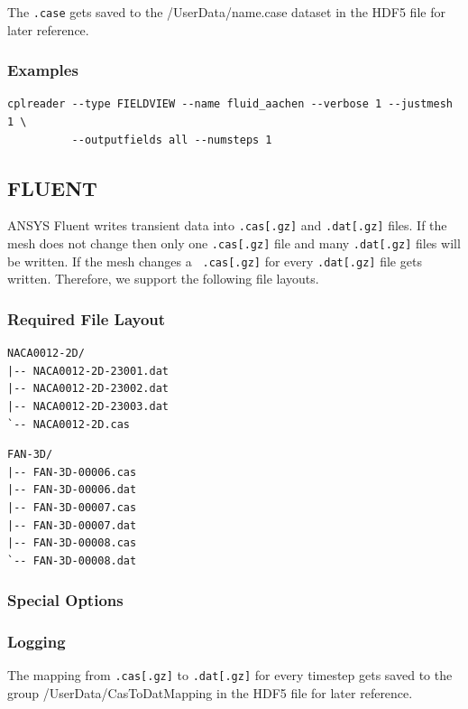 \documentclass[a4paper,10pt]{article}
\begin{document}
The {\tt .case} gets saved to the /UserData/name.case dataset in the HDF5 file
for later reference.

\subsubsection{Examples}

\begin{verbatim}
cplreader --type FIELDVIEW --name fluid_aachen --verbose 1 --justmesh 1 \
          --outputfields all --numsteps 1
\end{verbatim}

\newpage
\subsection{FLUENT}
\label{sec:fluent}

ANSYS Fluent  writes transient data  into {\tt .cas[.gz]} and  {\tt .dat[.gz]}
files.  If  the mesh does  not change then  only one {\tt .cas[.gz]}  file and
many  {\tt .dat[.gz]}  files will  be  written.  If  the mesh  changes a  {\tt
.cas[.gz]} for every {\tt .dat[.gz]} file gets written.  Therefore, we support
the following file layouts.


\subsubsection{Required File Layout}

\begin{verbatim}
NACA0012-2D/
|-- NACA0012-2D-23001.dat
|-- NACA0012-2D-23002.dat
|-- NACA0012-2D-23003.dat
`-- NACA0012-2D.cas
\end{verbatim}

\begin{verbatim}
FAN-3D/
|-- FAN-3D-00006.cas
|-- FAN-3D-00006.dat
|-- FAN-3D-00007.cas
|-- FAN-3D-00007.dat
|-- FAN-3D-00008.cas
`-- FAN-3D-00008.dat
\end{verbatim}

\subsubsection{Special Options}

\subsubsection{Logging} 

The mapping  from {\tt .cas[.gz]} to  {\tt .dat[.gz]} for  every timestep gets
saved  to the  group  /UserData/CasToDatMapping  in the  HDF5  file for  later
reference.
\end{document}
